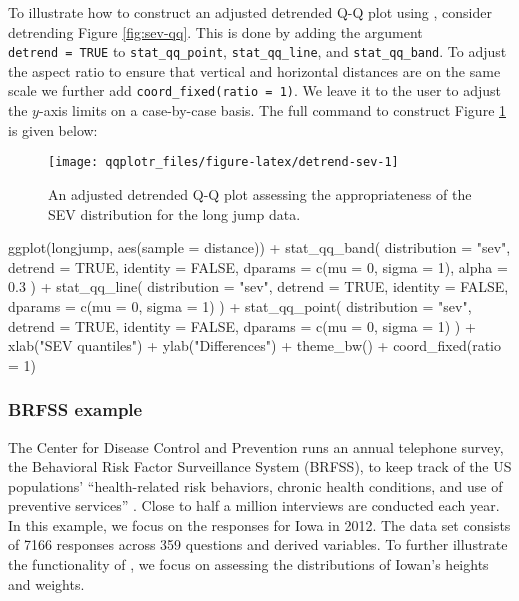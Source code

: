 \label{sec:detrending}

To illustrate how to construct an adjusted detrended Q-Q plot using
, consider detrending Figure \ref{fig:sev-qq}. This is done
by adding the argument \texttt{detrend\ =\ TRUE} to
\texttt{stat\_qq\_point}, \texttt{stat\_qq\_line}, and
\texttt{stat\_qq\_band}. To adjust the aspect ratio to ensure that
vertical and horizontal distances are on the same scale we further add
\texttt{coord\_fixed(ratio\ =\ 1)}. We leave it to the user to adjust
the \(y\)-axis limits on a case-by-case basis. The full command to
construct Figure \ref{fig:detrend-sev} is given below:

\begin{Schunk}
\begin{figure}

{\centering \texttt{[image: qqplotr\_files/figure-latex/detrend-sev-1]} 

}

\caption[An adjusted detrended Q-Q plot assessing the appropriateness of the SEV distribution for the long jump data]{An adjusted detrended Q-Q plot assessing the appropriateness of the SEV distribution for the long jump data.}\label{fig:detrend-sev}
\end{figure}
\end{Schunk}

\begin{Schunk}
\begin{Sinput}
ggplot(longjump, aes(sample = distance)) +
  stat_qq_band(
    distribution = "sev", 
    detrend = TRUE, 
    identity = FALSE,
    dparams = c(mu = 0, sigma = 1),  
    alpha = 0.3
  ) +
  stat_qq_line(
    distribution = "sev", 
    detrend = TRUE, 
    identity = FALSE,
    dparams = c(mu = 0, sigma = 1)
  ) +
  stat_qq_point(
    distribution = "sev", 
    detrend = TRUE,
    identity = FALSE,
    dparams = c(mu = 0, sigma = 1)
  ) +
  xlab("SEV quantiles") +
  ylab("Differences") +
  theme_bw() +
  coord_fixed(ratio = 1)
\end{Sinput}
\end{Schunk}

\subsubsection{BRFSS example}\label{brfss-example}

\label{sec:brfss}

The Center for Disease Control and Prevention runs an annual telephone
survey, the Behavioral Risk Factor Surveillance System (BRFSS), to keep
track of the US populations' ``health-related risk behaviors, chronic
health conditions, and use of preventive services'' \citep{brfss}. Close
to half a million interviews are conducted each year. In this example,
we focus on the responses for Iowa in 2012. The data set consists of
7166 responses across 359 questions and derived variables. To further
illustrate the functionality of , we focus on assessing the
distributions of Iowan's heights and weights.

